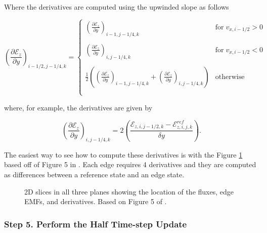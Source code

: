 Where the derivatives are computed using the upwinded slope as follows

\begin{equation}
    \label{eqn:emf-upwind-slope}
    \left( \frac{\partial \mathcal{E}_z }{\partial y} \right)_{i-1/2, j-1/4, k} =
        \begin{cases}
            \left( \frac{\partial \mathcal{E}_z }{\partial y} \right)_{i-1, j-1/4, k} & \text{for} \; v_{x, i-1/2} > 0
            \\
            \\
            \left( \frac{\partial \mathcal{E}_z }{\partial y} \right)_{i, j-1/4, k} & \text{for} \; v_{x, i-1/2} < 0
            \\
            \\
            \frac{1}{2} \left( \left( \frac{\partial \mathcal{E}_z }{\partial y} \right)_{i-1, j-1/4, k} + \left( \frac{\partial \mathcal{E}_z }{\partial y} \right)_{i, j-1/4, k} \right) & \text{otherwise}
            \\
            \\
        \end{cases}
\end{equation}

where, for example, the derivatives are given by

\begin{equation}
    \label{eqn:emf-slope}
    \left( \frac{\partial \mathcal{E}_z }{\partial y} \right)_{i, j-1/4, k} =
    2 \left( \frac{\mathcal{E}_{z,i,j-1/2,k} - \mathcal{E}_{z,i,j,k}^{ref}}{\delta y} \right).
\end{equation}

The easiest way to see how to compute these derivatives is with the Figure \ref{fig:emf-graph} based off of Figure 5 in \cite{stone_athena_2008}. Each edge requires 4 derivatives and they are computed as differences between a reference state and an edge state.

\begin{figure}[ht!]
    \caption{2D slices in all three planes showing the location of the fluxes, edge EMFs, and derivatives. Based on Figure 5 of \cite{stone_athena_2008}.}
    \label{fig:emf-graph}
\end{figure}

\subsubsection{Step 5. Perform the Half Time-step Update}
\label{vlct:half-dt-update}

